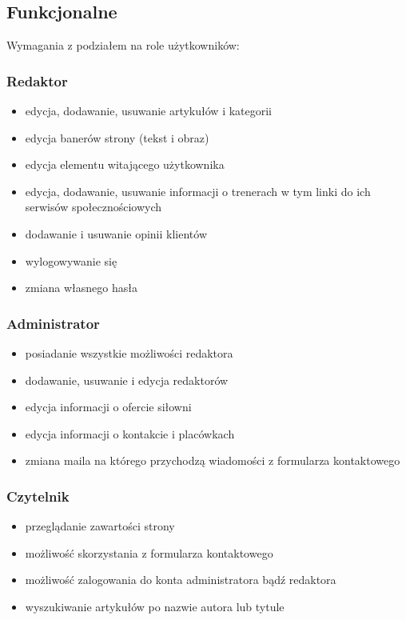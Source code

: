 \documentclass[12pt]{article}
\begin{document}
\subsection{Funkcjonalne}
Wymagania z podziałem na role użytkowników:
\subsubsection{Redaktor}
\begin{itemize}
\item edycja, dodawanie, usuwanie artykułów i kategorii
\item edycja banerów strony (tekst i obraz)
\item edycja elementu witającego użytkownika
\item edycja, dodawanie, usuwanie informacji o trenerach w tym linki do ich serwisów społecznościowych
\item dodawanie i usuwanie opinii klientów
\item wylogowywanie się
\item zmiana własnego hasła
\end{itemize}
\subsubsection{Administrator}
\begin{itemize}
\item posiadanie wszystkie możliwości redaktora
\item dodawanie, usuwanie i edycja redaktorów
\item edycja informacji o ofercie siłowni
\item edycja informacji o kontakcie i placówkach
\item zmiana maila na którego przychodzą wiadomości z formularza kontaktowego
\end{itemize}
\subsubsection{Czytelnik}
\begin{itemize}
\item przeglądanie zawartości strony
\item możliwość skorzystania z formularza kontaktowego
\item możliwość zalogowania do konta administratora bądź redaktora
\item wyszukiwanie artykułów po nazwie autora lub tytule
\end{itemize}
\end{document}
